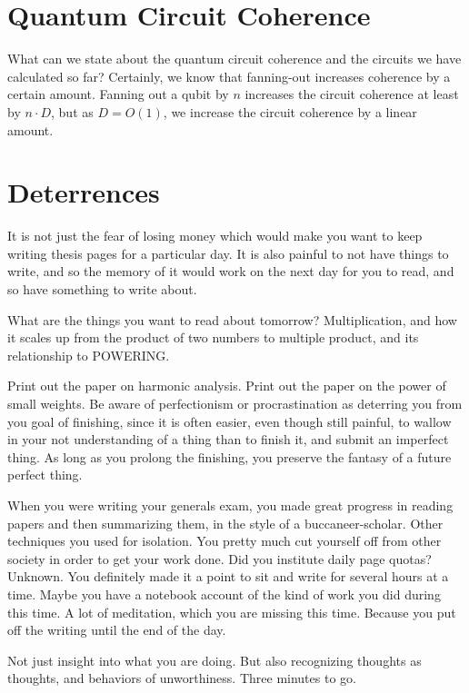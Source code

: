 \documentclass{article}
\begin{document}
\section{Quantum Circuit Coherence}

What can we state about the quantum circuit coherence and the circuits
we have calculated so far? Certainly, we know that fanning-out increases
coherence by a certain amount.
Fanning out a qubit by $n$ increases the circuit coherence at least by
$n\cdot D$, but as $D = O(1)$, we increase the circuit coherence by a
linear amount.

\section{Deterrences}

It is not just the fear of losing money which would make you want to
keep writing thesis pages for a particular day. It is also painful to
not have things to write, and so the memory of it would work on the
next day for you to read, and so have something to write about.

What are the things you want to read about tomorrow?
Multiplication, and how it scales up from the product of two numbers
to multiple product, and its relationship to POWERING.

Print out the paper on harmonic analysis. Print out the paper on the
power of small weights. Be aware of perfectionism or procrastination
as deterring you from you goal of finishing, since it is often easier,
even though still painful, to wallow in your not understanding of a thing
than to finish it, and submit an imperfect thing. As long as you prolong
the finishing, you preserve the fantasy of a future perfect thing.

When you were writing your generals exam, you made great progress in
reading papers and then summarizing them, in the style of a
buccaneer-scholar. Other techniques you used for isolation. You pretty
much cut yourself off from other society in order to get your work done.
Did you institute daily page quotas? Unknown. You definitely made it a
point to sit and write for several hours at a time. Maybe you have a
notebook account of the kind of work you did during this time.
A lot of meditation, which you are missing this time. Because you put off
the writing until the end of the day.

Not just insight into what you are doing. But also recognizing thoughts as
thoughts, and behaviors of unworthiness. Three minutes to go.
\end{document}
